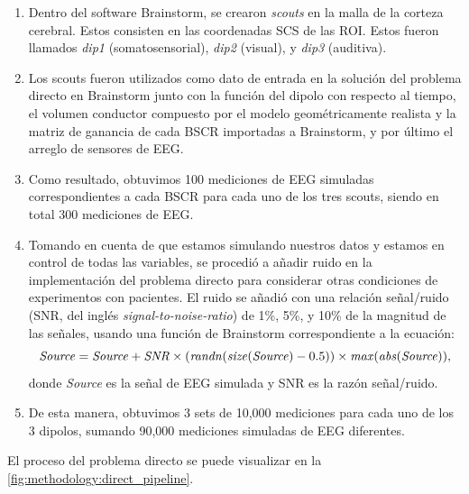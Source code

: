 \begin{enumerate}
	\item Dentro del software Brainstorm, se crearon \emph{scouts} en la malla de la corteza cerebral. Estos consisten en las coordenadas SCS de las ROI. Estos fueron llamados \emph{dip1} (somatosensorial), \emph{dip2} (visual), y \emph{dip3} (auditiva).
	\item Los scouts fueron utilizados como dato de entrada en la solución del problema directo en Brainstorm junto con la función del dipolo con respecto al tiempo, el volumen conductor compuesto por el modelo geométricamente realista y la matriz de ganancia de cada BSCR importadas a Brainstorm, y por último el arreglo de sensores de EEG.
	\item Como resultado, obtuvimos 100 mediciones de EEG simuladas correspondientes a cada BSCR para cada uno de los tres scouts, siendo en total 300 mediciones de EEG.
	\item Tomando en cuenta de que estamos simulando nuestros datos y estamos en control de todas las variables, se procedió a añadir ruido en la implementación del problema directo para considerar otras condiciones de experimentos con pacientes. El ruido se añadió con una relación señal/ruido (SNR, del inglés \emph{signal-to-noise-ratio}) de 1\%, 5\%, y 10\% de la magnitud de las señales, usando una función de Brainstorm correspondiente a la ecuación: 
	\begin{equation}
		\label{eq:snr}
		\text{\emph{Source}} = \text{\emph{Source}} + \text{\emph{SNR}}\times(\text{\emph{randn}}(\text{\emph{size}}(\text{\emph{Source}})-0.5)) \times \text{\emph{max}}(\text{\emph{abs}}(\text{\emph{Source}}))\text{,}
	\end{equation}
	donde \emph{Source} es la señal de EEG simulada y SNR es la razón señal/ruido.
	\item De esta manera, obtuvimos 3 sets de 10,000 mediciones para cada uno de los 3 dipolos, sumando 90,000 mediciones simuladas de EEG diferentes.
\end{enumerate}

El proceso del problema directo se puede visualizar en la \cref{fig:methodology:direct_pipeline}.

